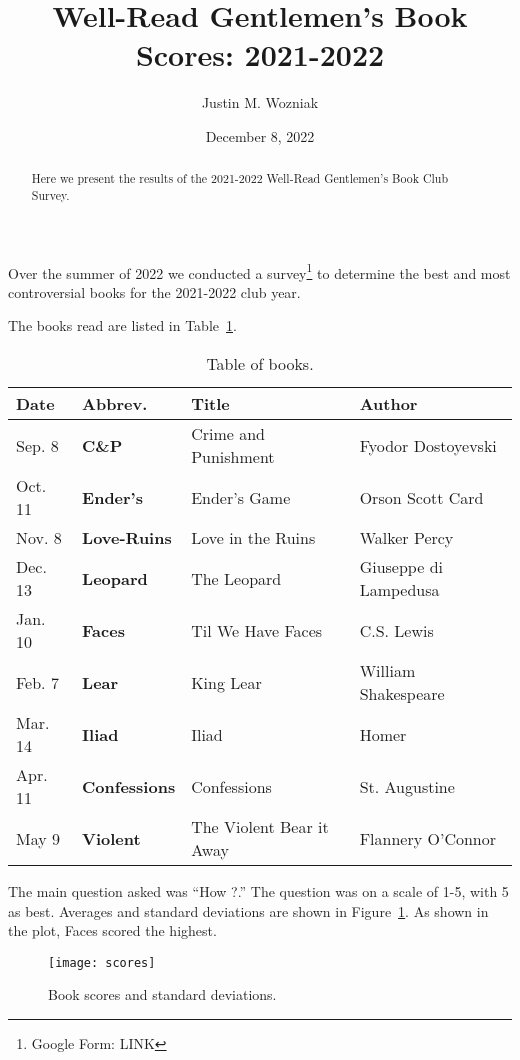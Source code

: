 \documentclass{article}
\newcommand{\B}[1]{\textbf{#1}}
\newcommand{\PLOT}[1]{Figure~\ref{plot:#1}}
\newcommand{\TABLE}[1]{Table~\ref{table:#1}}
\begin{document}
\title{Well-Read Gentlemen's Book Scores: 2021-2022}
\author{Justin M. Wozniak}
\date{December 8, 2022}

\maketitle

\begin{abstract}
\noindent Here we present the results of the 2021-2022 Well-Read Gentlemen's Book Club Survey.
\end{abstract}

\noindent Over the summer of 2022 we conducted a survey\footnote{Google Form: LINK} to determine the best and most controversial books for the 2021-2022 club year.

The books read are listed in \TABLE{books}.

\begin{table}
  \begin{tabular}{llll}
    \B{Date} & \B{Abbrev.} & \B{Title} & \B{Author} \\ \hline \hline
    Sep.  8 &  \B{C\&P} & Crime and Punishment & Fyodor Dostoyevski \\
    Oct. 11 & \B{Ender's} &  Ender's Game & Orson Scott Card \\
    Nov.  8 &  \B{Love-Ruins} & Love in the Ruins & Walker Percy \\
    Dec. 13 &  \B{Leopard} & The Leopard & Giuseppe di Lampedusa \\
    Jan. 10 & \B{Faces} & Til We Have Faces & C.S. Lewis \\
    Feb.  7 &  \B{Lear} & King Lear & William Shakespeare \\
    Mar. 14 &  \B{Iliad} & Iliad & Homer \\
    Apr. 11 & \B{Confessions} & Confessions & St. Augustine \\
    May   9 & \B{Violent} & The Violent Bear it Away & Flannery O'Connor \\
  \end{tabular}
  \caption{Table of books. \label{table:books}}
\end{table}

The main question asked was ``How ?.''  The question was on a scale of 1-5, with 5 as best.  Averages and standard deviations are shown in \PLOT{scores}.  As shown in the plot, Faces scored the highest.

\newcommand{\plotwidth}{0.9}

\begin{figure}
\texttt{[image: scores]}
\caption{Book scores and standard deviations.
  \label{plot:scores}}
\end{figure}
\end{document}
